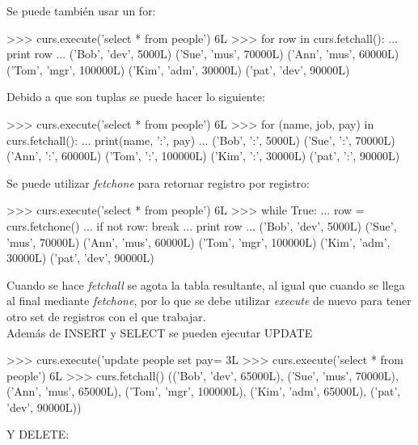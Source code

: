 Se puede también usar un for:\\

\begin{pyglist} [language=python]
>>> curs.execute('select * from people')
6L
>>> for row in curs.fetchall():
...     print row
... 
('Bob', 'dev', 5000L)
('Sue', 'mus', 70000L)
('Ann', 'mus', 60000L)
('Tom', 'mgr', 100000L)
('Kim', 'adm', 30000L)
('pat', 'dev', 90000L)
\end{pyglist}

Debido a que son tuplas se puede hacer lo siguiente:\\

\begin{pyglist} [language=python]
>>> curs.execute('select * from people')
6L
>>> for (name, job, pay) in curs.fetchall():
...     print(name, ':', pay)
... 
('Bob', ':', 5000L)
('Sue', ':', 70000L)
('Ann', ':', 60000L)
('Tom', ':', 100000L)
('Kim', ':', 30000L)
('pat', ':', 90000L)
\end{pyglist}

Se puede utilizar \textit{fetchone} para retornar registro por registro:\\

\begin{pyglist} [language=python]
>>> curs.execute('select * from people')
6L
>>> while True:
...     row = curs.fetchone()
...     if not row: break
...     print row
... 
('Bob', 'dev', 5000L)
('Sue', 'mus', 70000L)
('Ann', 'mus', 60000L)
('Tom', 'mgr', 100000L)
('Kim', 'adm', 30000L)
('pat', 'dev', 90000L)
\end{pyglist}

Cuando se hace \textit{fetchall} se agota la tabla resultante, al igual que cuando se llega al final mediante \textit{fetchone}, por lo que se debe utilizar \textit{execute} de nuevo para tener otro set de registros con el que trabajar.\\

Además de INSERT y SELECT se pueden ejecutar UPDATE\\

\begin{pyglist} [language=python]
>>> curs.execute('update people set pay=%
3L
>>> curs.execute('select * from people')
6L
>>> curs.fetchall()
(('Bob', 'dev', 65000L), ('Sue', 'mus', 70000L), ('Ann', 'mus', 65000L),
 ('Tom', 'mgr', 100000L), ('Kim', 'adm', 65000L), ('pat', 'dev', 90000L))
\end{pyglist}

Y DELETE:\\


